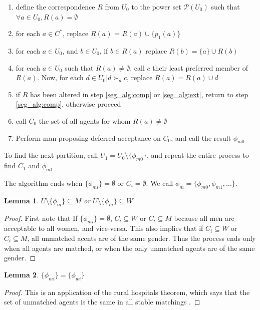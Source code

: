 \documentclass[WP]{AEA}
\newtheorem{lemma}{Lemma}
\begin{document}
\begin{enumerate}
	\item define the correspondence $R$ from $U_0$ to the power set $\mathcal{P}(U_0)$ such that $\forall a \in U_0, R(a) = \emptyset$
	\item for each $a \in C^*$, replace $R(a)$ =  $R(a) \cup \{p_1(a)\}$
	\item  \label{seg_alg:comp} for each $a \in U_0$, and $b \in U_0$, if $ b \in R(a)$ replace $R(b) = \{a\} \cup R(b)$
	\item  \label{seg_alg:ext} for each $a \in U_0$ such that $R(a) \neq \emptyset$, call  $c$ their least preferred member of $R(a)$. Now, for each $d \in U_0 | d \succ_a c$, replace $R(a) = R(a) \cup d$ 
	\item if $R$ has been altered in step \ref*{seg_alg:comp} or \ref*{seg_alg:ext}, return to step \ref*{seg_alg:comp}, otherwise proceed
	\item call $C_0$ the set of all agents for whom $R(a) \neq \emptyset$
	\item Perform man-proposing deferred acceptance on $C_0$, and call the result $\phi_{m0}$
\end{enumerate}

To find the next partition, call $U_1 = U_0 \setminus \{\phi_{m0}\}$, and repeat the entire process to find $C_1$ and $\phi_{m1}$

The algorithm ends when $\{\phi_{mi}\} = \emptyset$ or $C_i= \emptyset$.  We call $\phi_m = \{\phi_{m0}, \phi_{m1}, ...\}$.

\begin{lemma}
	$ U \setminus \{\phi_{m}\} \subseteq M$ or $ U \setminus \{\phi_{m}\} \subseteq W$ 
\end{lemma}

\begin{proof}
	First note that If $\{\phi_{mi}\} = \emptyset$, $C_i \subseteq W$ or $C_i \subseteq M$ because all men are acceptable to all women, and vice-versa. This also implies that if $C_i \subseteq W$ or $C_i \subseteq M$, all unmatched acents are of the same gender.  Thus the process ends only when all agents are matched, or when the only unmatched agents are of the same gender.
\end{proof}

\begin{lemma}
	$\{\phi_{mi}\}=\{\phi_{wi}\}$
\end{lemma}
\begin{proof}
	This is an application of the rural hospitals theorem, which says that the set of unmatched agents is the same in all stable matchings \cite{Roth1986}.
\end{proof}
\end{document}

